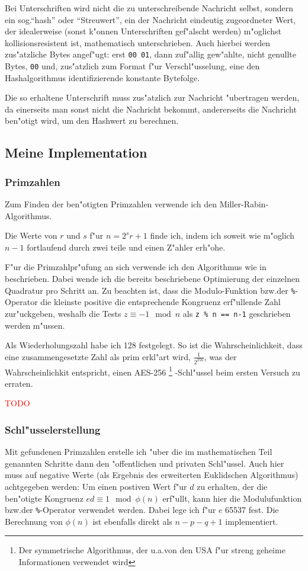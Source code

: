 \documentclass[12pt]{article}
\newcommand{\todo}[1]{\textcolor{red}{\mbox{TODO}}\marginpar{\textcolor{red}{#1}}}
\begin{document}
Bei Unterschriften wird nicht die zu unterschreibende Nachricht selbst,
sondern ein sog.\@ "`hash"' oder "`Streuwert"', ein der Nachricht eindeutig zugeordneter Wert,
der idealerweise (sonst k"onnen Unterschriften gef"alscht werden) m"oglichst kollisionsresistent ist,
mathematisch unterschrieben.
Auch hierbei werden zus"atzliche Bytes angef"ugt: erst \verb|00 01|, dann zuf"allig gew"ahlte, nicht genullte Bytes,
\verb|00| und, zus"atzlich zum Format f"ur Verschl"usselung, eine den Hashalgorithmus identifizierende konstante Bytefolge.

Die so erhaltene Unterschrift muss zus"atzlich zur Nachricht "ubertragen werden,
da einerseits man sonst nicht die Nachricht bekommt, andererseits die Nachricht
ben"otigt wird, um den Hashwert zu berechnen.

\subsection{Meine Implementation}
\subsubsection{Primzahlen}
Zum Finden der ben"otigten Primzahlen verwende ich den Miller-Rabin-Algorithmus.

Die Werte von $r$ und $s$ f"ur $n = 2^s r + 1$ finde ich, indem ich soweit wie m"oglich
$n - 1$ fortlaufend durch zwei teile und einen Z"ahler erh"ohe.

F"ur die Primzahlpr"ufung an sich verwende ich den Algorithmus wie in~\cite{hac} beschrieben.
Dabei wende ich die bereits beschriebene Optimierung der einzelnen Quadratur pro Schritt an.
Zu beachten ist, dass die Modulo-Funktion bzw.\@ der \verb|%|-Operator
die kleinste positive die entsprechende Kongruenz erf"ullende Zahl zur"uckgeben,
weshalb die Tests $z \equiv -1 \mod n$ als \verb|z % n == n-1| geschrieben werden m"ussen.

Als Wiederholungszahl habe ich 128 festgelegt.
So ist die Wahrscheinlichkeit, dass eine zusammengesetzte Zahl als prim erkl"art wird,
$\frac{1}{2^{256}}$, was der Wahrscheinlichkit entspricht, einen AES-256%
\footnote{Der symmetrische Algorithmus, der u.a.\@ von den USA f"ur streng geheime Informationen verwendet wird}%
-Schl"ussel beim ersten Versuch zu erraten.

\todo{Quellcode hier einf"ugen?}

\subsubsection{Schl"usselerstellung}
Mit gefundenen Primzahlen erstelle ich "uber die im mathematischen Teil genannten Schritte
dann den "offentlichen und privaten Schl"ussel.
Auch hier muss auf negative Werte (als Ergebnis des erweiterten Euklidschen Algorithmus)
achtgegeben werden: Um einen postiven Wert f"ur $d$ zu erhalten, der die ben"otigte Kongruenz
$ed \equiv 1 \mod \phi(n)$ erf"ullt, kann hier die Modulufunktion bzw.\@ der \verb|%|-Operator
verwendet werden.
Dabei lege ich f"ur $e$ 65537 fest.
Die Berechnung von $\phi(n)$ ist ebenfalls direkt als $n - p - q + 1$ implementiert.
\end{document}
